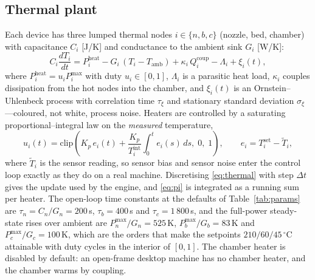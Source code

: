 \documentclass[preprint,12pt,authoryear,nopreprintline]{elsarticle}
\begin{document}
\subsection{Thermal plant}
\label{sec:thermal}
Each device has three lumped thermal nodes $i \in \{n,b,c\}$ (nozzle, bed,
chamber) with capacitance $C_i$ [J/K] and conductance to the ambient sink
$G_i$ [W/K]:
\begin{equation}
C_i \frac{dT_i}{dt} = P^{\mathrm{heat}}_i - G_i\,(T_i - T_{\mathrm{amb}})
+ \kappa_i\,Q^{\mathrm{coup}}_i - \Lambda_i + \xi_i(t),
\label{eq:thermal}
\end{equation}
where $P^{\mathrm{heat}}_i = u_i P^{\max}_i$ with duty $u_i \in [0,1]$,
$\Lambda_i$ is a parasitic heat load, $\kappa_i$ couples dissipation from the
hot nodes into the chamber, and $\xi_i(t)$ is an Ornstein--Uhlenbeck process
with correlation time $\tau_\xi$ and stationary standard deviation
$\sigma_\xi$---coloured, not white, process noise.
Heaters are controlled by a saturating proportional--integral law on the
\emph{measured} temperature,
\begin{equation}
u_i(t) = \mathrm{clip}\!\left(K_p\,e_i(t) + \frac{K_p}{T^{\mathrm{int}}_i}
\int_0^t e_i(s)\,ds,\; 0,\; 1\right),
\qquad e_i = T^{\mathrm{set}}_i - \tilde{T}_i ,
\label{eq:pi}
\end{equation}
where $\tilde{T}_i$ is the sensor reading, so sensor bias and sensor noise enter
the control loop exactly as they do on a real machine.
Discretising \eqref{eq:thermal} with step $\Delta t$ gives the update used by the
engine, and \eqref{eq:pi} is integrated as a running sum per heater.
The open-loop time constants at the defaults of Table~\ref{tab:params} are
$\tau_n = C_n/G_n = 200$\,s, $\tau_b = 400$\,s and $\tau_c = 1\,800$\,s, and the
full-power steady-state rises over ambient are $P^{\max}_n/G_n = 525$\,K,
$P^{\max}_b/G_b = 83$\,K and $P^{\max}_c/G_c = 100$\,K, which are the orders that
make the setpoints $210/60/45\,^{\circ}$C attainable with duty cycles in the
interior of $[0,1]$.
The chamber heater is disabled by default: an open-frame desktop machine has no
chamber heater, and the chamber warms by coupling.
\end{document}
